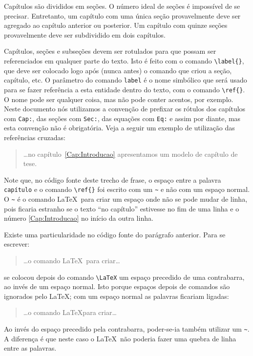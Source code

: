 Capítulos são divididos em seções. O número ideal de seções é
impossível de se precisar. Entretanto, um capítulo com uma única seção
provavelmente deve ser agregado ao capítulo anterior ou posterior. Um
capítulo com quinze seções provavelmente deve ser subdividido em dois
capítulos.

Capítulos, seções e subseções devem ser rotulados para que possam ser
referenciados em qualquer parte do texto.  Isto é feito com o comando
\verb|\label{}|, que deve ser colocado logo após (nunca antes) o
comando que criou a seção, capítulo, etc. O parâmetro do comando
\texttt{label} é o nome simbólico que será usado para se fazer
referência a esta entidade dentro do texto, com o comando
\verb|\ref{}|. O nome pode ser qualquer coisa, mas não pode conter
acentos, por exemplo. Neste documento nós utilizamos a convenção de
prefixar os rótulos dos capítulos com \texttt{Cap:}, das seções com
\texttt{Sec:}, das equações com \texttt{Eq:} e assim por diante, mas
esta convenção não é obrigatória. Veja a seguir um exemplo de
utilização das referências cruzadas:
\begin{quotation}
\dots no capítulo~\ref{Cap:Introducao} apresentamos um modelo de
capítulo de tese.
\end{quotation}
Note que, no código fonte deste trecho de frase, o espaço entre a palavra
\texttt{capítulo} e o comando \verb|\ref{}| foi escrito com
um \texttt{\~{}} e não com um espaço normal. O \texttt{\~{}} é o
comando \LaTeX\ para criar um espaço onde não se pode mudar de linha,
pois ficaria estranho se o texto ``no capítulo'' estivesse no fim de
uma linha e o número \ref{Cap:Introducao} no início da outra linha.

Existe uma particularidade no código fonte do parágrafo anterior. Para
se escrever:
\begin{quotation}
\dots o comando \LaTeX\ para criar\dots
\end{quotation}
se colocou depois do comando \verb|\LaTeX| um espaço
precedido de uma contrabarra, ao invés de um espaço normal. Isto porque
espaços depois de comandos são ignorados pelo \LaTeX; com um espaço
normal as palavras ficariam ligadas:
\begin{quotation}
\dots o comando \LaTeX para criar\dots
\end{quotation}
Ao invés do espaço precedido pela contrabarra, poder-se-ia também
utilizar um \texttt{\~{}}. A diferença é que neste caso o \LaTeX\ não
poderia fazer uma quebra de linha entre as palavras.
